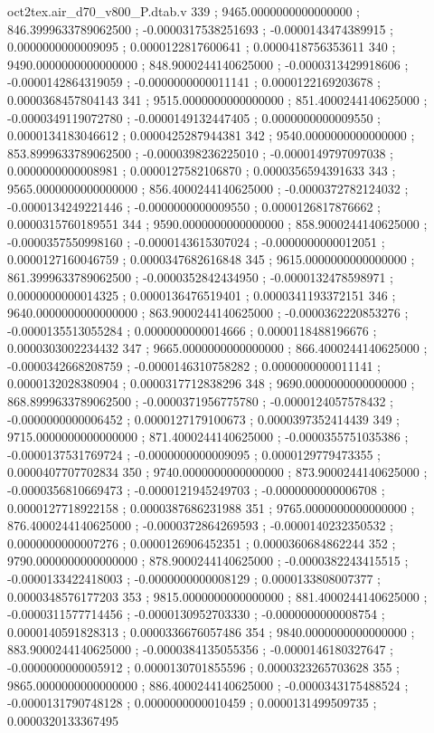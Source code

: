 \begin{filecontents}[overwrite]{oct2tex.air_d70_v800_P.dtab.v}
339 ; 9465.0000000000000000 ; 846.3999633789062500 ; -0.0000317538251693 ; -0.0000143474389915 ; 0.0000000000009095 ; 0.0000122817600641 ; 0.0000418756353611
340 ; 9490.0000000000000000 ; 848.9000244140625000 ; -0.0000313429918606 ; -0.0000142864319059 ; -0.0000000000011141 ; 0.0000122169203678 ; 0.0000368457804143
341 ; 9515.0000000000000000 ; 851.4000244140625000 ; -0.0000349119072780 ; -0.0000149132447405 ; 0.0000000000009550 ; 0.0000134183046612 ; 0.0000425287944381
342 ; 9540.0000000000000000 ; 853.8999633789062500 ; -0.0000398236225010 ; -0.0000149797097038 ; 0.0000000000008981 ; 0.0000127582106870 ; 0.0000356594391633
343 ; 9565.0000000000000000 ; 856.4000244140625000 ; -0.0000372782124032 ; -0.0000134249221446 ; -0.0000000000009550 ; 0.0000126817876662 ; 0.0000315760189551
344 ; 9590.0000000000000000 ; 858.9000244140625000 ; -0.0000357550998160 ; -0.0000143615307024 ; -0.0000000000012051 ; 0.0000127160046759 ; 0.0000347682616848
345 ; 9615.0000000000000000 ; 861.3999633789062500 ; -0.0000352842434950 ; -0.0000132478598971 ; 0.0000000000014325 ; 0.0000136476519401 ; 0.0000341193372151
346 ; 9640.0000000000000000 ; 863.9000244140625000 ; -0.0000362220853276 ; -0.0000135513055284 ; 0.0000000000014666 ; 0.0000118488196676 ; 0.0000303002234432
347 ; 9665.0000000000000000 ; 866.4000244140625000 ; -0.0000342668208759 ; -0.0000146310758282 ; 0.0000000000011141 ; 0.0000132028380904 ; 0.0000317712838296
348 ; 9690.0000000000000000 ; 868.8999633789062500 ; -0.0000371956775780 ; -0.0000124057578432 ; -0.0000000000006452 ; 0.0000127179100673 ; 0.0000397352414439
349 ; 9715.0000000000000000 ; 871.4000244140625000 ; -0.0000355751035386 ; -0.0000137531769724 ; -0.0000000000009095 ; 0.0000129779473355 ; 0.0000407707702834
350 ; 9740.0000000000000000 ; 873.9000244140625000 ; -0.0000356810669473 ; -0.0000121945249703 ; -0.0000000000006708 ; 0.0000127718922158 ; 0.0000387686231988
351 ; 9765.0000000000000000 ; 876.4000244140625000 ; -0.0000372864269593 ; -0.0000140232350532 ; 0.0000000000007276 ; 0.0000126906452351 ; 0.0000360684862244
352 ; 9790.0000000000000000 ; 878.9000244140625000 ; -0.0000382243415515 ; -0.0000133422418003 ; -0.0000000000008129 ; 0.0000133808007377 ; 0.0000348576177203
353 ; 9815.0000000000000000 ; 881.4000244140625000 ; -0.0000311577714456 ; -0.0000130952703330 ; -0.0000000000008754 ; 0.0000140591828313 ; 0.0000336676057486
354 ; 9840.0000000000000000 ; 883.9000244140625000 ; -0.0000384135055356 ; -0.0000146180327647 ; -0.0000000000005912 ; 0.0000130701855596 ; 0.0000323265703628
355 ; 9865.0000000000000000 ; 886.4000244140625000 ; -0.0000343175488524 ; -0.0000131790748128 ; 0.0000000000010459 ; 0.0000131499509735 ; 0.0000320133367495

\end{filecontents}

